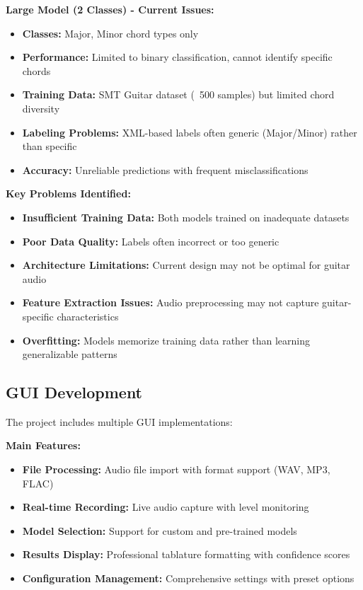 \documentclass[11pt]{article}
\begin{document}
\textbf{Large Model (2 Classes) - Current Issues:}
\begin{itemize}[leftmargin=*,itemsep=1pt]
  \item \textbf{Classes:} Major, Minor chord types only
  \item \textbf{Performance:} Limited to binary classification, cannot identify specific chords
  \item \textbf{Training Data:} SMT Guitar dataset (~500 samples) but limited chord diversity
  \item \textbf{Labeling Problems:} XML-based labels often generic (Major/Minor) rather than specific
  \item \textbf{Accuracy:} Unreliable predictions with frequent misclassifications
\end{itemize}

\textbf{Key Problems Identified:}
\begin{itemize}[leftmargin=*,itemsep=2pt]
  \item \textbf{Insufficient Training Data:} Both models trained on inadequate datasets
  \item \textbf{Poor Data Quality:} Labels often incorrect or too generic
  \item \textbf{Architecture Limitations:} Current design may not be optimal for guitar audio
  \item \textbf{Feature Extraction Issues:} Audio preprocessing may not capture guitar-specific characteristics
  \item \textbf{Overfitting:} Models memorize training data rather than learning generalizable patterns
\end{itemize}

\subsection*{GUI Development}
The project includes multiple GUI implementations:

\textbf{Main Features:}
\begin{itemize}[leftmargin=*,itemsep=2pt]
  \item \textbf{File Processing:} Audio file import with format support (WAV, MP3, FLAC)
  \item \textbf{Real-time Recording:} Live audio capture with level monitoring
  \item \textbf{Model Selection:} Support for custom and pre-trained models
  \item \textbf{Results Display:} Professional tablature formatting with confidence scores
  \item \textbf{Configuration Management:} Comprehensive settings with preset options
\end{itemize}
\end{document}
